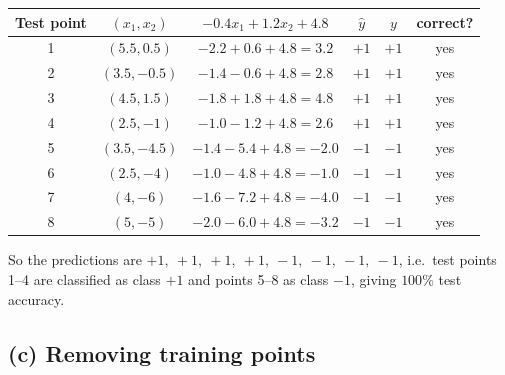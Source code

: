 \documentclass[11pt]{article}
\begin{document}
\begin{center}
\begin{tabular}{cccccc}
\toprule
Test point & $(x_1,x_2)$ & $-0.4x_1+1.2x_2+4.8$ & $\hat y$ & $y$ & correct?\\
\midrule
1 & $(5.5, 0.5)$ & $-2.2+0.6+4.8=3.2$ & $+1$ & $+1$ & yes\\
2 & $(3.5, -0.5)$ & $-1.4-0.6+4.8=2.8$ & $+1$ & $+1$ & yes\\
3 & $(4.5, 1.5)$ & $-1.8+1.8+4.8=4.8$ & $+1$ & $+1$ & yes\\
4 & $(2.5, -1)$ & $-1.0-1.2+4.8=2.6$ & $+1$ & $+1$ & yes\\
5 & $(3.5, -4.5)$ & $-1.4-5.4+4.8=-2.0$ & $-1$ & $-1$ & yes\\
6 & $(2.5, -4)$ & $-1.0-4.8+4.8=-1.0$ & $-1$ & $-1$ & yes\\
7 & $(4, -6)$ & $-1.6-7.2+4.8=-4.0$ & $-1$ & $-1$ & yes\\
8 & $(5, -5)$ & $-2.0-6.0+4.8=-3.2$ & $-1$ & $-1$ & yes\\
\bottomrule
\end{tabular}
\end{center}

So the predictions are
$\boxed{+1,\ +1,\ +1,\ +1,\ -1,\ -1,\ -1,\ -1}$, i.e.\ test points 1--4 are
classified as class $+1$ and points 5--8 as class $-1$, giving $100\%$ test accuracy.

\subsection*{(c) Removing training points}
\end{document}

